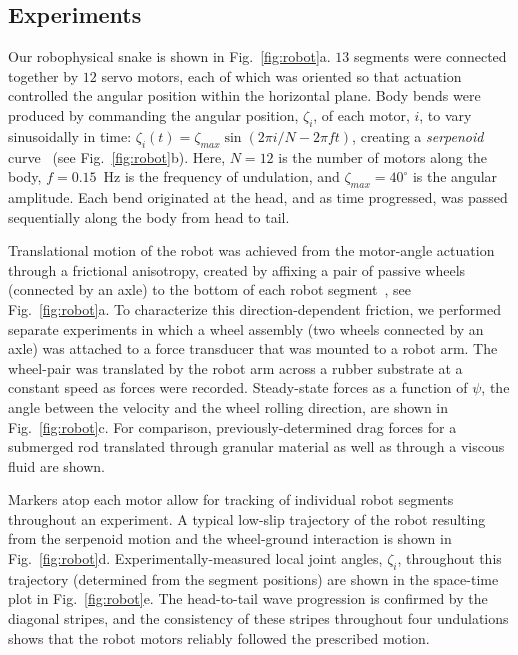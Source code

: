 \documentclass[aps,pre,twocolumn,superscriptaddress]{revtex4-1}
\begin{document}
\subsection{Experiments}

Our robophysical snake is shown in Fig.~\ref{fig:robot}a. $13$ segments were connected together by $12$ servo motors, each of which was oriented so that actuation controlled the angular position within the horizontal plane. Body bends were produced by commanding the angular position, $\zeta_i$, of each motor, $i$, to vary sinusoidally in time: $\zeta_i(t) = \zeta_{max} \sin(2\pi i/N -2\pi f t)$, creating a \emph{serpenoid} curve~\cite{Hirose:1993} (see Fig.~\ref{fig:robot}b). Here, $N = 12$ is the number of motors along the body, $f = 0.15$~Hz is the frequency of undulation, and $\zeta_{max} = 40^{\circ}$ is the angular amplitude. Each bend originated at the head, and as time progressed, was passed sequentially along the body from head to tail.

Translational motion of the robot was achieved from the motor-angle actuation through a frictional anisotropy, created by affixing a pair of passive wheels (connected by an axle) to the bottom of each robot segment~\cite{hirose2009snake}, see Fig.~\ref{fig:robot}a. To characterize this direction-dependent friction, we performed separate experiments in which a wheel assembly (two wheels connected by an axle) was attached to a force transducer that was mounted to a robot arm. The wheel-pair was translated by the robot arm across a rubber substrate at a constant speed as forces were recorded. Steady-state forces as a function of $\psi$, the angle between the velocity and the wheel rolling direction, are shown in Fig.~\ref{fig:robot}c. For comparison, previously-determined drag forces for a submerged rod translated through granular material as well as through a viscous fluid are shown.

Markers atop each motor allow for tracking of individual robot segments throughout an experiment. A typical low-slip trajectory of the robot resulting from the serpenoid motion and the wheel-ground interaction is shown in Fig.~\ref{fig:robot}d. Experimentally-measured local joint angles, $\zeta_i$, throughout this trajectory (determined from the segment positions) are shown in the space-time plot in  Fig.~\ref{fig:robot}e. The head-to-tail wave progression is confirmed by the diagonal stripes, and the consistency of these stripes throughout four undulations shows that the robot motors reliably followed the prescribed motion.
\end{document}

